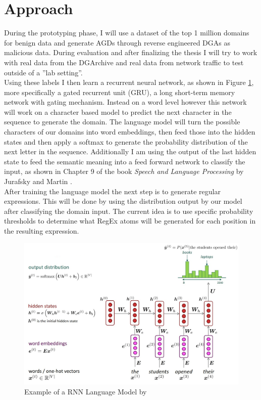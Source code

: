 \documentclass[a4paper, 12pt]{article}
\begin{document}
\section{Approach}
During the prototyping phase, I will use a dataset of the top 1 million domains
\cite{CiscoPopularityList} for benign data and
generate AGDs through reverse engineered DGAs \cite{baderBaderjDomain_generation_algorithms2024}
as malicious data. During evaluation and
after finalizing the thesis I will try to work with real data from the
DGArchive \cite{DGArchiveFraunhoferFKIE} and real data from
network traffic to test outside of a ''lab setting''.\\
Using these labels I then learn a recurrent neural network, as shown in Figure \ref{fig:RNNLanguageModel},
more specifically a gated recurrent unit (GRU), a long short-term memory network with gating mechanism.
Instead on a word level however this network will work on a character based model to predict the next
character in the sequence to generate the domain.
The language model will turn the possible characters of our domains into word embeddings, then feed
those into the hidden states and then apply a softmax to generate the probability distribution of
the next letter in the sequence.
Additionally I am using the output of the last hidden state to feed the semantic meaning into a feed
forward network to classify the input, as shown in Chapter 9 of the book \textit{Speech and Language
Processing} by Jurafsky and Martin \cite{jurafskySpeechLanguageProcessing}.\\ 
After training the language model the next step is to generate regular expressions. This will be
done by using the distribution output by our model after classifying the domain input. The current
idea is to use specific probability thresholds to determine what RegEx atoms will be generated for
each position in the resulting expression.
\begin{figure}[h]
    \includegraphics[width=\textwidth]{cs224n-spr2024-lecture05-language-model.png}
    \caption{Example of a RNN Language Model by \cite{manningNaturalLanguageProcessing2024}}
    \label{fig:RNNLanguageModel}
\end{figure}
\end{document}
